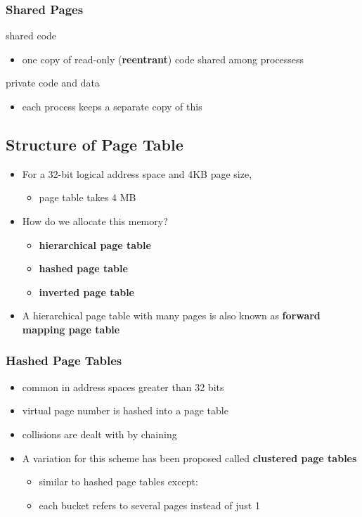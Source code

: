 \documentclass[11pt]{article}
\begin{document}
\subsubsection{Shared Pages}
\label{sec:org562d82e}
shared code 
\begin{itemize}
\item one copy of read-only (\textbf{reentrant}) code shared among processess
\end{itemize}
private code and data
\begin{itemize}
\item each process keeps a separate copy of this
\end{itemize}
\subsection{Structure of Page Table}
\label{sec:org2184513}
\begin{itemize}
\item For a 32-bit logical address space and 4KB page size, 
\begin{itemize}
\item page table takes 4 MB
\end{itemize}
\item How do we allocate this memory?
\begin{itemize}
\item \textbf{hierarchical page table}
\item \textbf{hashed page table}
\item \textbf{inverted page table}
\end{itemize}
\item A hierarchical page table with many pages is also known as
\textbf{forward mapping page table}
\end{itemize}
\subsubsection{Hashed Page Tables}
\label{sec:orged9fe00}
\begin{itemize}
\item common in address spaces greater than 32 bits
\item virtual page number is hashed into a page table
\item collisions are dealt with by chaining
\item A variation for this scheme has been proposed called \textbf{clustered page tables}
\begin{itemize}
\item similar to hashed page tables except:
\item each bucket refers to several pages instead of just 1
\end{itemize}
\end{itemize}
\end{document}
